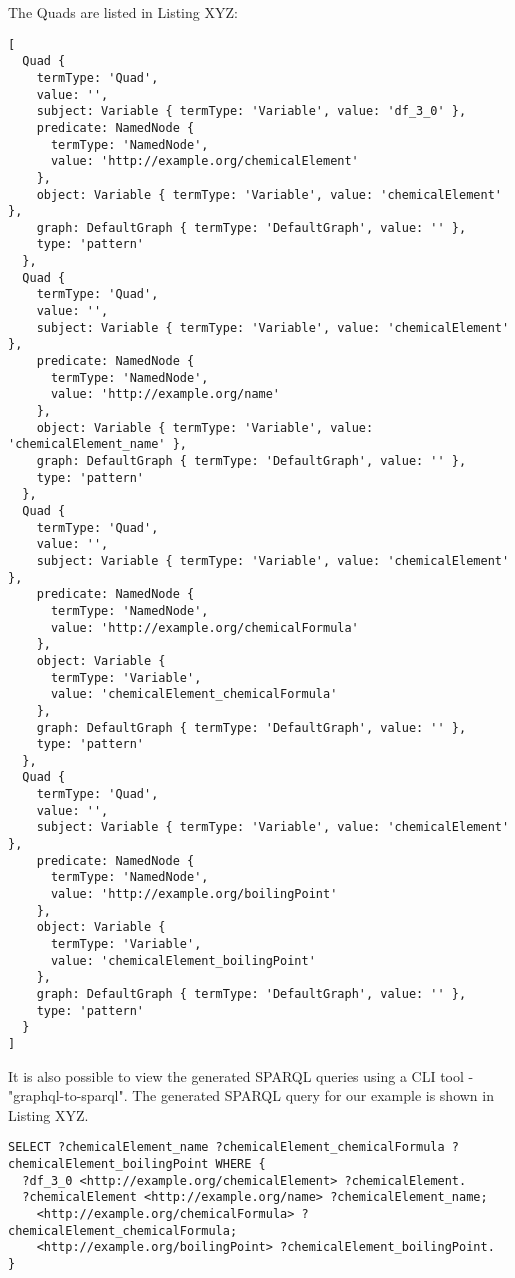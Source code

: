 The Quads are listed in Listing XYZ:

\begin{minipage}{\linewidth}
\begin{lstlisting}[label=listing:listing9, caption={The expansion of Quads}]
[
  Quad {
    termType: 'Quad',
    value: '',
    subject: Variable { termType: 'Variable', value: 'df_3_0' },
    predicate: NamedNode {
      termType: 'NamedNode',
      value: 'http://example.org/chemicalElement'
    },
    object: Variable { termType: 'Variable', value: 'chemicalElement' },
    graph: DefaultGraph { termType: 'DefaultGraph', value: '' },
    type: 'pattern'
  },
  Quad {
    termType: 'Quad',
    value: '',
    subject: Variable { termType: 'Variable', value: 'chemicalElement' },
    predicate: NamedNode {
      termType: 'NamedNode',
      value: 'http://example.org/name'
    },
    object: Variable { termType: 'Variable', value: 'chemicalElement_name' },
    graph: DefaultGraph { termType: 'DefaultGraph', value: '' },
    type: 'pattern'
  },
  Quad {
    termType: 'Quad',
    value: '',
    subject: Variable { termType: 'Variable', value: 'chemicalElement' },
    predicate: NamedNode {
      termType: 'NamedNode',
      value: 'http://example.org/chemicalFormula'
    },
    object: Variable {
      termType: 'Variable',
      value: 'chemicalElement_chemicalFormula'
    },
    graph: DefaultGraph { termType: 'DefaultGraph', value: '' },
    type: 'pattern'
  },
  Quad {
    termType: 'Quad',
    value: '',
    subject: Variable { termType: 'Variable', value: 'chemicalElement' },
    predicate: NamedNode {
      termType: 'NamedNode',
      value: 'http://example.org/boilingPoint'
    },
    object: Variable {
      termType: 'Variable',
      value: 'chemicalElement_boilingPoint'
    },
    graph: DefaultGraph { termType: 'DefaultGraph', value: '' },
    type: 'pattern'
  }
]
\end{lstlisting}
\end{minipage}

It is also possible to view the generated SPARQL queries using a CLI tool - "graphql-to-sparql". The generated SPARQL query for our example is shown in Listing XYZ.

\begin{minipage}{\linewidth}
\begin{lstlisting}[label=listing:listing10, caption={Genertaed SPARQL query}]
SELECT ?chemicalElement_name ?chemicalElement_chemicalFormula ?chemicalElement_boilingPoint WHERE {
  ?df_3_0 <http://example.org/chemicalElement> ?chemicalElement.
  ?chemicalElement <http://example.org/name> ?chemicalElement_name;
    <http://example.org/chemicalFormula> ?chemicalElement_chemicalFormula;
    <http://example.org/boilingPoint> ?chemicalElement_boilingPoint.
}
\end{lstlisting}
\end{minipage}

